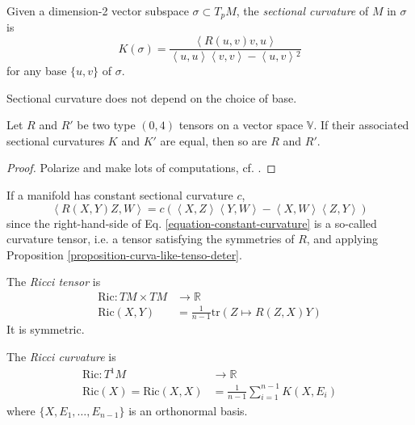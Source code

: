 Given a dimension-2 vector subspace
$\sigma\subset T_pM$, the {\it sectional
curvature} of $M$ in $\sigma$ is
\begin{equation}
\label{equation-sectional-curvature}
K(\sigma)=\frac{\left\langle{}R(u,v)v,u\right\rangle{}}
{\left\langle{}u,u\right\rangle{}\left\langle{}v,v\right\rangle{}-\left\langle{}u,
v\right\rangle{}^2}
\end{equation}
for any base $\{u,v\}$ of $\sigma$.

\begin{lemma}
\label{lemma-secti-curva-well-defin}
Sectional curvature does not depend on the
choice of base.
\end{lemma}

\begin{proposition}
\label{proposition-curva-like-tenso-deter}
Let $R$ and $R'$ be two type $(0,4)$ tensors
on a vector space $\mathbb{V}$. If
their associated sectional curvatures $K$ and
$K'$ are equal, then so are $R$
and $R'$.
\end{proposition}

\begin{proof}
Polarize and make lots of computations, cf.
\cite{doc}.
\end{proof}

If a manifold has constant sectional
curvature $c$,
\begin{equation}
\label{equation-constant-curvature}
\left\langle{}R(X,Y)Z,W\right\rangle{}=
c(\left\langle{}X,Z\right\rangle{}\left\langle{}Y,W\right\rangle{}-\left\langle{}X,
W\right\rangle{}\left\langle{}Z,Y\right\rangle{})
\end{equation}
since the right-hand-side of Eq.
\ref{equation-constant-curvature} is a
so-called curvature tensor, i.e. a tensor
satisfying the symmetries of $R$, and
applying Proposition
\ref{proposition-curva-like-tenso-deter}.

The {\it Ricci tensor} is
\begin{equation}
\label{equation-Ricci-tensor}
\begin{aligned}
\text{Ric}: TM\times TM &\longrightarrow
\mathbb{R} \\
\text{Ric}(X,Y)&=\frac{1}{n-1}\text{tr}
(Z\mapsto
R(Z,X)Y)
\end{aligned}
\end{equation}
It is symmetric.

The {\it Ricci curvature} is
\begin{equation}
\label{equation-Ricci-curvature}
\begin{aligned}
\text{Ric}: T^1M &\longrightarrow \mathbb{R}
\\
\text{Ric}(X)=\text{Ric}(X,X)&=\frac{1}{n-1}
\sum_{i=1}^{n-1}K(X,E_i)
\end{aligned}
\end{equation}
where $\{X,E_1,\ldots,E_{n-1}\}$ is an
orthonormal basis.

